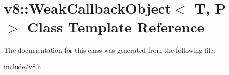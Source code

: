 \hypertarget{classv8_1_1_weak_callback_object}{}\section{v8\+:\+:Weak\+Callback\+Object$<$ T, P $>$ Class Template Reference}
\label{classv8_1_1_weak_callback_object}


The documentation for this class was generated from the following file\+:\begin{DoxyCompactItemize}
\item 
include/v8.\+h\end{DoxyCompactItemize}
